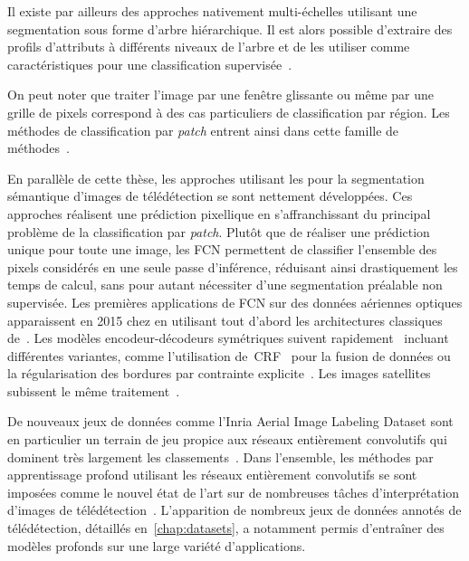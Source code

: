Il existe par ailleurs des approches nativement multi-échelles utilisant une segmentation sous forme d'arbre hiérarchique. Il est alors possible d'extraire des profils d'attributs à différents niveaux de l'arbre et de les utiliser comme caractéristiques pour une classification supervisée~\cite{cui_combining_2016,pham_feature_2018}.

On peut noter que traiter l'image par une fenêtre glissante ou même par une grille de pixels correspond à des cas particuliers de classification par région. Les méthodes de classification par \emph{patch} entrent ainsi dans cette famille de méthodes~\cite{papadomanolaki_patch-based_2017,vakalopoulou_building_2015}.

En parallèle de cette thèse, les approches utilisant les  pour la segmentation sémantique d'images de télédétection se sont nettement développées. Ces approches réalisent une prédiction pixellique en s'affranchissant du principal problème de la classification par \emph{patch}. Plutôt que de réaliser une prédiction unique pour toute une image, les \gls{FCN} permettent de classifier l'ensemble des pixels considérés en une seule passe d'inférence, réduisant ainsi drastiquement les temps de calcul, sans pour autant nécessiter d'une segmentation préalable non supervisée. Les premières applications de \gls{FCN} sur des données aériennes optiques apparaissent en 2015 chez \citet{paisitkriangkrai_effective_2015,sherrah_fully_2016} en utilisant tout d'abord les architectures classiques de~\citet{long_fully_2015}. Les modèles encodeur-décodeurs symétriques suivent rapidement~\cite{volpi_dense_2017,audebert_semantic_2016} incluant différentes variantes, comme l'utilisation de~\gls{CRF}~\cite{liu_dense_2017} pour la fusion de données ou la régularisation des bordures par contrainte explicite~\cite{marmanis_classification_2017}. Les images satellites subissent le même traitement~\cite{fu_classification_2017}.

De nouveaux jeux de données comme l'Inria Aerial Image Labeling Dataset sont en particulier un terrain de jeu propice aux réseaux entièrement convolutifs qui dominent très largement les classements~\cite{huang_large-scale_2018}. Dans l'ensemble, les méthodes par apprentissage profond utilisant les réseaux entièrement convolutifs se sont imposées comme le nouvel état de l'art sur de nombreuses tâches d'interprétation d'images de télédétection~\cite{liu_comparing_2018}. L'apparition de nombreux jeux de données annotés de télédétection, détaillés en~\cref{chap:datasets}, a notamment permis d'entraîner des modèles profonds sur une large variété d'applications.

%
%
\printbibliography
